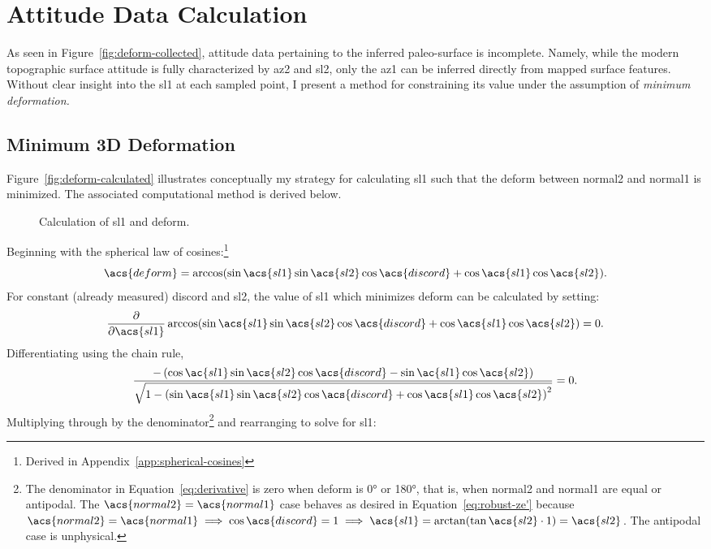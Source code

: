 \section{Attitude Data Calculation}\label{sec:calculation}

As seen in Figure~\ref{fig:deform-collected}, attitude data pertaining to the inferred paleo-surface is incomplete. Namely, while the modern topographic surface attitude is fully characterized by \acs{az2} and \acs{sl2}, only the \acf{az1} can be inferred directly from mapped surface features. Without clear insight into the \acf{sl1} at each sampled point, I present a method for constraining its value under the assumption of \emph{minimum deformation.} 

\subsection{Minimum 3D Deformation}\label{sec:3d-deform}
Figure~\ref{fig:deform-calculated} illustrates conceptually my strategy for calculating \acs{sl1} such that the \acf{deform} between \acs{normal2} and \acs{normal1} is minimized. The associated computational method is derived below.
\begin{figure}
    \centering
    
    \caption{Calculation of \acf{sl1} and \acf{deform}.}\label{fig:deform}
\end{figure}
Beginning with the spherical law of cosines:\footnote{Derived in Appendix~\ref{app:spherical-cosines}}
\begin{equation}
    \acs{deform}
    =\arccos(\sin\acs{sl1}\sin\acs{sl2}\cos\acs{discord}
    +\cos\acs{sl1}\cos\acs{sl2}).
    \label{eq:central-angle}
\end{equation}
For constant (already measured) \acs{discord} and \acs{sl2}, the value of \acs{sl1} which minimizes \acs{deform} can be calculated by setting:
\begin{equation}
    \frac{\partial}{\partial \acs{sl1}}
    \arccos(\sin\acs{sl1}\sin\acs{sl2}\cos\acs{discord}
    +\cos\acs{sl1}\cos\acs{sl2})
    =0.\label{eq:mimimum}
\end{equation}
Differentiating using the chain rule,
\begin{equation}
    \frac{-\,(\cos\ac{sl1}\sin\acs{sl2}
    \cos\acs{discord}-\sin\ac{sl1}\cos\acs{sl2})}
    {\sqrt{1-{(\sin\acs{sl1}\sin\acs{sl2}\cos\acs{discord}
    +\cos\acs{sl1}\cos\acs{sl2})}^2}}
    =0.\label{eq:derivative}
\end{equation}
Multiplying through by the denominator\footnote{The denominator in Equation~\eqref{eq:derivative} is zero when \acs{deform} is \ang{0} or \ang{180}, that is, when \acs{normal2} and \acs{normal1} are equal or antipodal. The $\acs{normal2}=\acs{normal1}$ case behaves as desired in Equation~\eqref{eq:robust-ze'} because $\acs{normal2}=\acs{normal1}\implies\cos\acs{discord}=1\implies\acs{sl1}=\arctan(\tan\acs{sl2}\cdot1)=\acs{sl2}$. The antipodal case is unphysical.} and rearranging to solve for \acs{sl1}:
